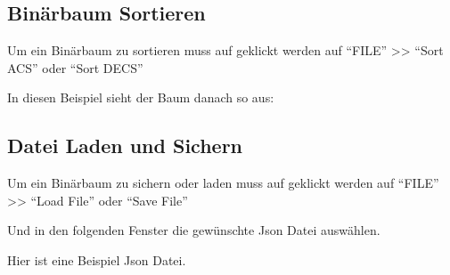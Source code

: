 \documentclass[letterpaper,10pt,ngerman]{sphinxmanual}
\begin{document}
\noindent{}


\subsection{Binärbaum Sortieren}
\label{\detokenize{interface:binarbaum-sortieren}}
Um ein Binärbaum zu sortieren muss auf geklickt werden auf ``FILE'' \textgreater{}\textgreater{} ``Sort ACS'' oder ``Sort DECS''

\noindent{}

In diesen Beispiel sieht der Baum danach so aus:

\noindent{}


\subsection{Datei Laden und Sichern}
\label{\detokenize{interface:datei-laden-und-sichern}}
Um ein Binärbaum zu sichern oder laden muss auf geklickt werden auf ``FILE'' \textgreater{}\textgreater{} ``Load File'' oder ``Save File''

\noindent{}

Und in den folgenden Fenster die gewünschte Json Datei auswählen.

\noindent{}

Hier ist eine Beispiel Json Datei.

\begin{sphinxVerbatim}[commandchars=\\\{\}]
\PYG{p}{[}
  \PYG{p}{[}\PYG{p}{]}
  \PYG{p}{[}\PYG{p}{]}
  \PYG{p}{[}\PYG{p}{]}
  \PYG{p}{[}\PYG{p}{]}
  \PYG{p}{[}\PYG{p}{]}
  \PYG{p}{[}\PYG{p}{]}
  \PYG{p}{[}\PYG{p}{]}
  \PYG{p}{[}\PYG{p}{]}
\PYG{p}{]}
\end{sphinxVerbatim}
\end{document}
